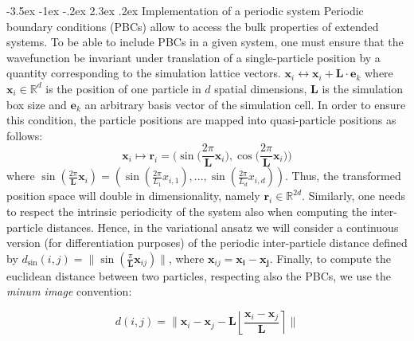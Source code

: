 \documentclass[a4paper, 12pt, oneside]{article}
\makeatletter
\renewcommand{\subsection}{\@startsection{subsection}{1}{\z@}%
             {-3.5ex \@plus-1ex \@minus-.2ex}%
             {2.3ex \@plus.2ex}%
             {\normalfont\normalsize\bfseries}}
\makeatother
\begin{document}
\subsection{Implementation of a periodic system}\label{sec:PBCs}
Periodic boundary conditions (PBCs) allow to access the bulk properties of 
extended systems. To be able to include PBCs in a given system, one must ensure 
that the wavefunction be invariant under translation of a single-particle position by a quantity corresponding to 
the simulation lattice vectors.
$\bm{x}_i \leftrightarrow \bm{x}_i+\bm{L}\cdot\bm{e}_k$ where $\bm{x}_i \in \mathbb{R}^d$ is the position of one particle 
in $d$ spatial dimensions, $\bm{L}$ is the simulation box size and $\bm{e}_k$ an arbitrary basis vector of the simulation 
cell. In order to ensure this condition, the particle positions are mapped into quasi-particle 
positions as follows: 
\begin{equation}
    \bm{x}_i \longmapsto \bm{r}_i=\Biggr(\sin\biggr(\dfrac{2\pi}{\bm{L}}\bm{x}_i\biggr), \cos\biggr(\dfrac{2\pi}{\bm{L}}\bm{x}_i\biggr)\Biggr)
\end{equation}
where $\sin(\frac{2\pi}{\bm{L}}\bm{x}_i) = (\sin(\frac{2\pi }{L_1}x_{i,1}),\ldots,\sin(\frac{2\pi}{L_d} x_{i,d}))$. Thus, 
the transformed position space will double in dimensionality, namely $\bm{r}_i \in \mathbb{R}^{2d}$. Similarly, one needs to respect the intrinsic 
periodicity of the system also when computing the inter-particle distances. Hence, in the variational ansatz we will consider a continuous version 
(for differentiation purposes) of the 
periodic inter-particle distance defined by $d_{\sin}(i,j) = \lVert \sin\left(\frac{\pi}{\bm{L}}\bm{x}_{ij}\right)\rVert$, where $\bm{x}_{ij} = \bm{x_i}-\bm{x_j}$.
Finally, to compute the euclidean distance between two particles, respecting also the PBCs, we use the \textit{minum image} convention:

\begin{equation}
    d(i,j) = \biggr\lVert \bm{x}_i -\bm{x}_j - \bm{L}\left\lfloor \dfrac{\bm{x}_i -\bm{x}_j}{\bm{L}}\right\rceil \biggr\rVert
\end{equation}
\end{document}
